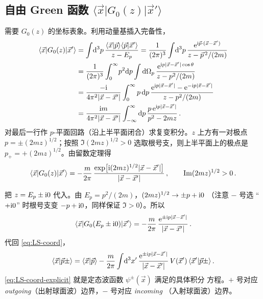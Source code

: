 \subsection{自由 Green 函数 $\langle\vec x|G_0(z)|\vec x'\rangle$}

需要 $G_0(z)$ 的坐标表象。利用动量基插入完备性，
\begin{align}
  \langle\vec x|G_0(z)|\vec x'\rangle
  &= \int\!\mathrm{d}^3 p\,\frac{\langle\vec x|\vec p\rangle\langle\vec p|\vec x'\rangle}{z-E_p}
   = \frac{1}{(2\pi)^3}\int\!\mathrm{d}^3 p\,
     \frac{\mathrm{e}^{\mathrm{i} \vec p\cdot(\vec x-\vec x')}}{z-\vec p^{\,2}/(2m)}\nonumber\\
  &= \frac{1}{(2\pi)^3}\int_0^\infty\! p^2\mathrm{d} p\int\mathrm{d}\Omega_p\,
     \frac{\mathrm{e}^{\mathrm{i} p|\vec x-\vec x'|\cos\theta}}{z-p^2/(2m)}\nonumber\\
  &= \frac{-\mathrm{i}}{4\pi^2|\vec x-\vec x'|}\int_0^\infty p\,\mathrm{d} p\,
     \frac{\mathrm{e}^{\mathrm{i} p|\vec x-\vec x'|}-\mathrm{e}^{-\mathrm{i} p|\vec x-\vec x'|}}{z-p^2/(2m)}\nonumber\\
  &= \frac{\mathrm{i} m}{4\pi^2|\vec x-\vec x'|}\int_{-\infty}^{\infty}\mathrm{d} p\,
     \frac{p\,\mathrm{e}^{\mathrm{i} p|\vec x-\vec x'|}}{p^2-2mz}\,.
\end{align}
对最后一行作 $p$-平面回路（沿上半平面闭合）求复变积分。$z$ 上方有一对极点
$p=\pm(2mz)^{1/2}$；按照 $\Im (2mz)^{1/2}>0$ 选取根号支，则上半平面上的极点是
$p_+ = +(2mz)^{1/2}$。由留数定理得
\begin{equation}
  \langle\vec x|G_0(z)|\vec x'\rangle
  = -\frac{m}{2\pi}\,\frac{\exp\!\big[\mathrm{i}(2mz)^{1/2}|\vec x-\vec x'|\big]}{|\vec x-\vec x'|}\,,
  \qquad \Im(2mz)^{1/2}>0\,.
  \label{eq:G0-coord}
\end{equation}

把 $z = E_p\pm\mathrm{i} 0$ 代入。由 $E_p = p^2/(2m)$，$(2mz)^{1/2}\to \pm p+\mathrm{i} 0$
（注意 $-$ 号选 ``$+\mathrm{i} 0$'' 时根号支变 $-p+\mathrm{i} 0$，同样保证 $\Im>0$）。所以
\begin{equation}
  \langle\vec x|G_0(E_p\pm\mathrm{i} 0)|\vec x'\rangle
  = -\frac{m}{2\pi}\,\frac{\mathrm{e}^{\pm \mathrm{i} p|\vec x-\vec x'|}}{|\vec x-\vec x'|}\,.
  \label{eq:G0-eps}
\end{equation}
代回 \eqref{eq:LS-coord}，
\begin{equation}
  \langle\vec x|\vec p\pm\rangle
  = \langle\vec x|\vec p\rangle
  - \frac{m}{2\pi}\int\!\mathrm{d}^3 x'\,
    \frac{\mathrm{e}^{\pm \mathrm{i} p|\vec x-\vec x'|}}{|\vec x-\vec x'|}\,V(\vec x')\,
    \langle\vec x'|\vec p\pm\rangle\,.
  \label{eq:LS-coord-explicit}
\end{equation}
\eqref{eq:LS-coord-explicit} 就是定态波函数 $\psi^\pm(\vec x)$ 满足的具体积分
方程。$+$ 号对应 \emph{outgoing}（出射球面波）边界，$-$ 号对应 \emph{incoming}
（入射球面波）边界。

